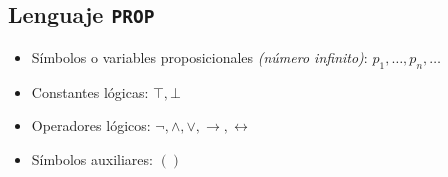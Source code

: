 \documentclass[a4paper]{article}
\begin{document}
\subsection{Lenguaje \texttt{PROP}}
\begin{itemize}
    \item Símbolos o variables proposicionales \textit{(número infinito)}: \(p_{1}, \dotsc, p_{n}, \dotsc\)
    \item Constantes lógicas: \(\top, \bot\)
    \item Operadores lógicos: \(\neg, \land, \lor, \rightarrow, \leftrightarrow \)
    \item Símbolos auxiliares: \(\left(\right)\)
\end{itemize}
\end{document}
